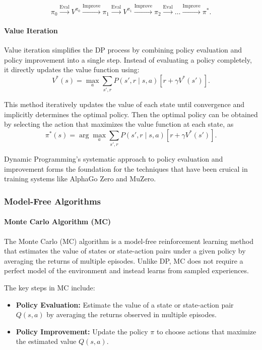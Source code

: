 \[
    \pi_0 \xrightarrow{\text{Eval}} V^{\pi_0} \xrightarrow{\text{Improve}} \pi_1 \xrightarrow{\text{Eval}} V^{\pi_1} \xrightarrow{\text{Improve}} \pi_2 \xrightarrow{\text{Eval}} \ldots \xrightarrow{\text{Improve}} \pi^*.
\]

\paragraph{Value Iteration}
Value iteration simplifies the DP process by combining policy evaluation and
policy improvement into a single step. Instead of evaluating a policy
completely, it directly updates the value function using:
\begin{equation}
    V^*(s) = \max_a \sum_{s', r} P(s', r \mid s, a) \left[ r + \gamma V^*(s') \right].
\end{equation}

This method iteratively updates the value of each state until convergence and
implicitly determines the optimal policy. Then the optimal policy can be
obtained by selecting the action that maximizes the value function at each
state, as
\begin{equation}
    \pi^*(s) = \arg\max_a \sum_{s', r} P(s', r \mid s, a) \left[ r + \gamma V^*(s') \right].
\end{equation}

Dynamic Programming's systematic approach to policy evaluation and improvement
forms the foundation for the techniques that have been cruical in training
systems like AlphaGo Zero and MuZero.

\subsubsection{\textbf{Model-Free Algorithms}}

\paragraph{Monte Carlo Algorithm (MC)}
The Monte Carlo (MC) algorithm is a model-free reinforcement learning method
that estimates the value of states or state-action pairs under a given policy
by averaging the returns of multiple episodes. Unlike DP, MC does not require a
perfect model of the environment and instead learns from sampled experiences.

The key steps in MC include:

\begin{itemize}
    \item \textbf{Policy Evaluation:} Estimate the value of a state or state-action pair \( Q(s, a) \) by averaging the returns observed in multiple episodes.
    \item \textbf{Policy Improvement:} Update the policy \( \pi \) to choose actions that maximize the estimated value \( Q(s, a) \).
\end{itemize}

